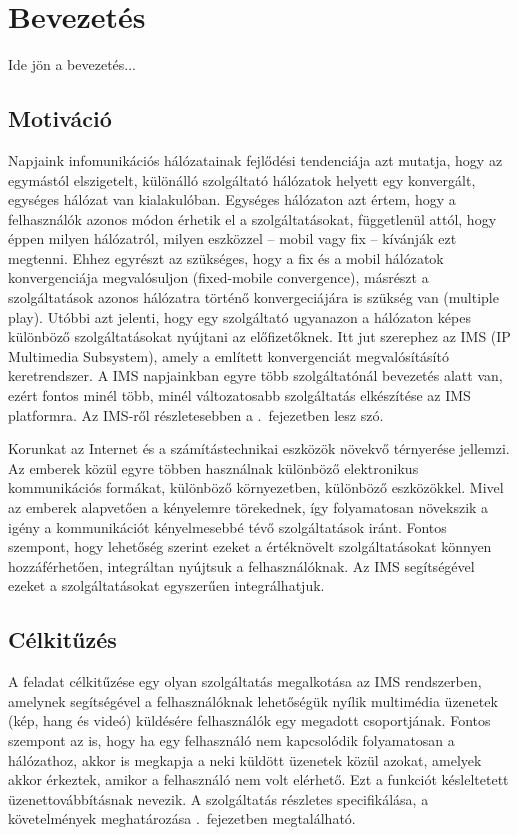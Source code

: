 
\section{Bevezetés}

Ide jön a bevezetés...

\subsection{Motiváció}

Napjaink infomunikációs hálózatainak fejlődési tendenciája azt mutatja, hogy az egymástól elszigetelt,
különálló szolgáltató hálózatok helyett egy konvergált, egységes hálózat van kialakulóban. Egységes hálózaton azt értem, hogy a felhasználók azonos módon érhetik el a szolgáltatásokat, függetlenül attól, hogy éppen milyen hálózatról, milyen eszközzel -- mobil vagy fix -- kívánják ezt megtenni. Ehhez egyrészt az szükséges, hogy a fix és a mobil hálózatok konvergenciája megvalósuljon (fixed-mobile convergence), másrészt a szolgáltatások azonos hálózatra történő konvergeciájára is szükség van (multiple play). Utóbbi azt jelenti, hogy egy szolgáltató ugyanazon a hálózaton képes különböző szolgáltatásokat nyújtani az előfizetőknek. Itt jut szerephez az IMS (IP Multimedia Subsystem), amely a említett konvergenciát megvalósításító keretrendszer. A IMS napjainkban egyre több szolgáltatónál bevezetés alatt van, ezért fontos minél több, minél változatosabb szolgáltatás elkészítése az IMS platformra.  Az IMS-ről részletesebben a .~fejezetben lesz szó.

Korunkat az Internet és a számítástechnikai eszközök növekvő térnyerése jellemzi. Az emberek közül egyre többen használnak különböző elektronikus kommunikációs formákat, különböző környezetben, különböző eszközökkel. Mivel az emberek alapvetően a kényelemre törekednek, így folyamatosan növekszik a igény a  kommunikációt kényelmesebbé tévő szolgáltatások iránt. Fontos szempont, hogy lehetőség szerint ezeket a értéknövelt szolgáltatásokat könnyen hozzáférhetően, integráltan nyújtsuk a felhasználóknak. Az IMS segítségével ezeket a szolgáltatásokat egyszerűen integrálhatjuk.

\subsection{Célkitűzés}

A feladat célkitűzése egy olyan szolgáltatás megalkotása az IMS rendszerben, amelynek
segítségével a felhasználóknak lehetőségük nyílik multimédia üzenetek (kép, hang és videó) küldésére felhasználók egy megadott csoportjának. Fontos szempont az is, hogy ha egy felhasználó nem kapcsolódik folyamatosan a hálózathoz, akkor is megkapja a neki küldött üzenetek közül azokat, amelyek akkor érkeztek, amikor a felhasználó nem volt elérhető. Ezt a funkciót késleltetett üzenettovábbításnak nevezik. A szolgáltatás részletes specifikálása, a követelmények meghatározása .~fejezetben megtalálható.

